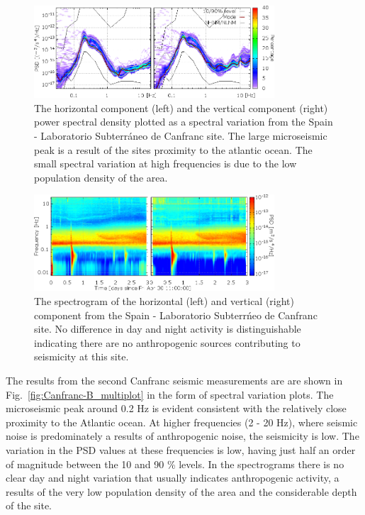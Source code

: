 \begin{figure}[h]
	\begin{center}
		\includegraphics[width=0.8\textwidth]{./Sec_SiteInfra/Figures/Canfranc-B_multiplot1}
		\caption{The horizontal component (left) and the vertical component (right) power spectral density plotted as a spectral variation from the Spain - Laboratorio Subterr\'aneo de Canfranc site. The large microseismic peak is a result of the sites proximity to the atlantic ocean. The small spectral variation at high frequencies is due to the low population density of the area.}
		\label{fig:Canfranc-B_multiplot1}
		\end{center}
\end{figure}

\begin{figure}[h]
	\begin{center}
		\includegraphics[width=0.8\textwidth]{./Sec_SiteInfra/Figures/Canfranc-B_multiplot2}
		\caption{The spectrogram of the horizontal (left) and vertical (right) component from the Spain - Laboratorio Subterr\'neo de Canfranc site. No difference in day and night activity is distinguishable indicating there are no anthropogenic sources contributing to seismicity at this site. }
		\label{fig:Canfranc-B_multiplot2}
	\end{center}
\end{figure}

The results from the second Canfranc seismic measurements are are shown in Fig.~\ref{fig:Canfranc-B_multiplot} in the form of spectral variation plots. The microseismic peak around 0.2 Hz is evident consistent with the relatively close proximity to the Atlantic ocean. At higher frequencies (2 - 20 Hz), where seismic noise is predominately a results of anthropogenic noise, the seismicity is low. The variation in the PSD values at these frequencies is low, having just half an order of magnitude between the 10 and 90 \% levels. In the spectrograms there is no clear day and night variation that usually indicates anthropogenic activity, a results of the very low population density of the area and the considerable depth of the site. 
 \FloatBarrier

